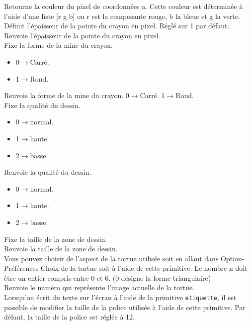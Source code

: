  Retourne la couleur du pixel de coordonnées a. Cette couleur est déterminée à l'aide d'une liste [r g b] ou r est la composante rouge, b la bleue et g la verte.  \\
Définit l'épaisseur de la pointe du crayon en pixel. Réglé sur 1 par défaut. \\
Renvoie l'épaisseur de la pointe du crayon en pixel. \\
 Fixe la forme de la mine du crayon. 
\begin{itemize}
 \item 0$\to$Carré.
 \item 1$\to$Rond.
\end{itemize}
\noindent
{}
Renvoie la forme de la mine du crayon. 0$\to$Carré. 1$\to$Rond.\\
 Fixe la qualité du dessin.
\begin{itemize}
 \item 0$\to$normal.
 \item 1$\to$haute.
 \item 2$\to$basse.
\end{itemize}
\noindent
{}
 Renvoie la qualité du dessin. 
\begin{itemize}
 \item 0$\to$normal.
 \item 1$\to$haute.
 \item 2$\to$basse.
\end{itemize}
\noindent
{}
Fixe la taille de la zone de dessin.\\
Renvoie la taille de la zone de dessin.\\
Vous pouvez choisir de l'aspect de la tortue utilisée soit en allant dans Option-Préférences-Choix de la tortue soit à l'aide de cette primitive. Le nombre n doit être un entier compris entre 0 et 6. (0 désigne la forme triangulaire)\\
Renvoie le numéro qui représente l'image actuelle de la tortue.\\
Lorsqu'on écrit du texte sur l'écran à l'aide de la primitive \texttt{etiquette}, il est possible de modifier la taille de la police utilisée à l'aide de cette primitive. Par défaut, la taille de la police est réglée à 12.\\
